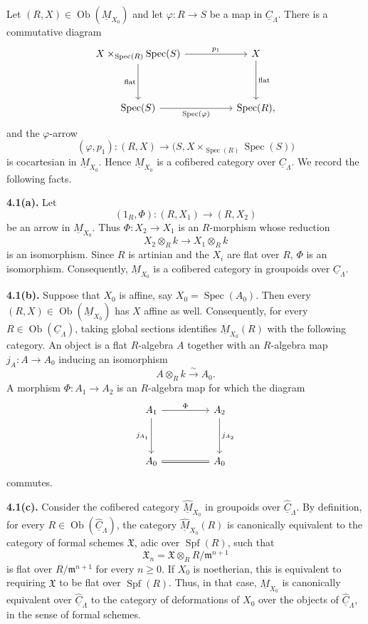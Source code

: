 Let $(R,X)\in\operatorname{Ob}(\underline M_{X_0})$ and let
$\varphi:R\longrightarrow S$ be a map in $\underline C_\Lambda$.
There is a commutative diagram
\[
\begin{tikzcd}[column sep=huge,row sep=huge]
X\times_{\operatorname{Spec}(R)}\operatorname{Spec}(S)
 \arrow[r,"p_1"] \arrow[d,"\mathrm{flat}"']
& X \arrow[d,"\mathrm{flat}"] \\
\operatorname{Spec}(S)
 \arrow[r,"\operatorname{Spec}(\varphi)"']
& \operatorname{Spec}(R),
\end{tikzcd}
\]
and the $\varphi$-arrow
\[
 (\varphi,p_1):(R,X)\longrightarrow
 \bigl(S,X\times_{\operatorname{Spec}(R)}\operatorname{Spec}(S)\bigr)
\]
is cocartesian in $\underline M_{X_0}$. Hence
$\underline M_{X_0}$ is a cofibered category over
$\underline C_\Lambda$. We record the following facts.


\medskip
\noindent\textbf{4.1(a).}
Let
\[
 (1_R,\Phi):(R,X_1)\longrightarrow(R,X_2)
\]
be an arrow in $\underline M_{X_0}$. Thus
$\Phi:X_2\longrightarrow X_1$ is an $R$-morphism whose reduction
\[
 X_2\otimes_Rk\longrightarrow X_1\otimes_Rk
\]
is an isomorphism. Since $R$ is artinian and the $X_i$ are flat over
$R$, $\Phi$ is an isomorphism. Consequently,
$\underline M_{X_0}$ is a cofibered category in groupoids over
$\underline C_\Lambda$.

\medskip
\noindent\textbf{4.1(b).}
Suppose that $X_0$ is affine, say
$X_0=\operatorname{Spec}(A_0)$. Then every
$(R,X)\in\operatorname{Ob}(\underline M_{X_0})$ has $X$ affine as
well. Consequently, for every
$R\in\operatorname{Ob}(\underline C_\Lambda)$, taking global
sections identifies $\underline M_{X_0}(R)$ with the following
category. An object is a flat $R$-algebra $A$ together with an
$R$-algebra map $j_A:A\longrightarrow A_0$ inducing an isomorphism
\[
 A\otimes_Rk\xrightarrow{\ \sim\ }A_0.
\]
A morphism $\Phi:A_1\longrightarrow A_2$ is an $R$-algebra map for
which the diagram
\[
\begin{tikzcd}[column sep=huge,row sep=huge]
A_1 \arrow[r,"\Phi"] \arrow[d,"j_{A_1}"']
& A_2 \arrow[d,"j_{A_2}"] \\
A_0 \arrow[r,equal] & A_0
\end{tikzcd}
\]
commutes.

\medskip
\noindent\textbf{4.1(c).}
Consider the cofibered category $\widehat{\underline M}_{X_0}$ in
groupoids over $\widehat{\underline C}_\Lambda$. By definition, for
every $R\in\operatorname{Ob}(\widehat{\underline C}_\Lambda)$, the
category $\widehat{\underline M}_{X_0}(R)$ is canonically equivalent
to the category of formal schemes $\mathfrak X$, adic over
$\operatorname{Spf}(R)$, such that
\[
 \mathfrak X_n
 =\mathfrak X\otimes_R R/\mathfrak m^{n+1}
\]
is flat over $R/\mathfrak m^{n+1}$ for every $n\geq0$. If $X_0$ is
noetherian, this is equivalent to requiring $\mathfrak X$ to be flat
over $\operatorname{Spf}(R)$. Thus, in that case,
$\widehat{\underline M}_{X_0}$ is canonically equivalent over
$\widehat{\underline C}_\Lambda$ to the category of deformations of
$X_0$ over the objects of $\widehat{\underline C}_\Lambda$, in the
sense of formal schemes.

